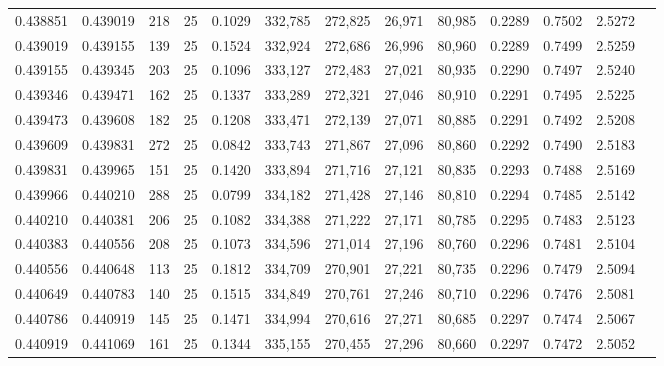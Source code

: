 \begin{tabular}{rrrrrrrrrrrrr}
0.438851 & 0.439019 &   218 &  25 &                                     0.1029 & 332,785 & 272,825 &  26,971 &  80,985 & 0.2289 & 0.7502 & 2.5272 \\
0.439019 & 0.439155 &   139 &  25 &                                     0.1524 & 332,924 & 272,686 &  26,996 &  80,960 & 0.2289 & 0.7499 & 2.5259 \\
0.439155 & 0.439345 &   203 &  25 &                                     0.1096 & 333,127 & 272,483 &  27,021 &  80,935 & 0.2290 & 0.7497 & 2.5240 \\
0.439346 & 0.439471 &   162 &  25 &                                     0.1337 & 333,289 & 272,321 &  27,046 &  80,910 & 0.2291 & 0.7495 & 2.5225 \\
0.439473 & 0.439608 &   182 &  25 &                                     0.1208 & 333,471 & 272,139 &  27,071 &  80,885 & 0.2291 & 0.7492 & 2.5208 \\
0.439609 & 0.439831 &   272 &  25 &                                     0.0842 & 333,743 & 271,867 &  27,096 &  80,860 & 0.2292 & 0.7490 & 2.5183 \\
0.439831 & 0.439965 &   151 &  25 &                                     0.1420 & 333,894 & 271,716 &  27,121 &  80,835 & 0.2293 & 0.7488 & 2.5169 \\
0.439966 & 0.440210 &   288 &  25 &                                     0.0799 & 334,182 & 271,428 &  27,146 &  80,810 & 0.2294 & 0.7485 & 2.5142 \\
0.440210 & 0.440381 &   206 &  25 &                                     0.1082 & 334,388 & 271,222 &  27,171 &  80,785 & 0.2295 & 0.7483 & 2.5123 \\
0.440383 & 0.440556 &   208 &  25 &                                     0.1073 & 334,596 & 271,014 &  27,196 &  80,760 & 0.2296 & 0.7481 & 2.5104 \\
0.440556 & 0.440648 &   113 &  25 &                                     0.1812 & 334,709 & 270,901 &  27,221 &  80,735 & 0.2296 & 0.7479 & 2.5094 \\
0.440649 & 0.440783 &   140 &  25 &                                     0.1515 & 334,849 & 270,761 &  27,246 &  80,710 & 0.2296 & 0.7476 & 2.5081 \\
0.440786 & 0.440919 &   145 &  25 &                                     0.1471 & 334,994 & 270,616 &  27,271 &  80,685 & 0.2297 & 0.7474 & 2.5067 \\
0.440919 & 0.441069 &   161 &  25 &                                     0.1344 & 335,155 & 270,455 &  27,296 &  80,660 & 0.2297 & 0.7472 & 2.5052 \\

\end{tabular}
